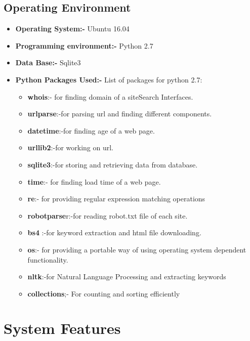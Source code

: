 \documentclass{scrreprt}
\begin{document}
\section{Operating Environment}
\begin{itemize}

\item \textbf{Operating System:-} Ubuntu 16.04
\item \textbf{Programming environment:-} Python 2.7
\item \textbf{Data Base:-} Sqlite3
\item \textbf{Python Packages Used:-} 
List of packages for python 2.7:
\begin{itemize}
 \item\textbf{whois}:- for finding domain of a siteSearch Interfaces.
\item\textbf{urlparse}:-for parsing url and finding different components.
 \item\textbf{datetime}:-for finding age of a web page.
\item\textbf{urllib2}:-for working on url.
\item\textbf{sqlite3}:-for storing and retrieving data from database.
\item\textbf{time}:- for finding load time of a web page.
\item\textbf {re}:- for providing  regular expression matching operations
\item\textbf{robotparse}r:-for reading robot.txt file of each site.
\item\textbf{bs4} :-for keyword extraction and html file downloading.
 \item\textbf{os}:- for providing  a portable way of using operating system      dependent functionality.
\item\textbf{nltk}:-for  Natural Language Processing and extracting keywords
\item\textbf{collections};- For counting and sorting efficiently
 
\end{itemize}

\end{itemize}


\chapter{System Features}
\end{document}
